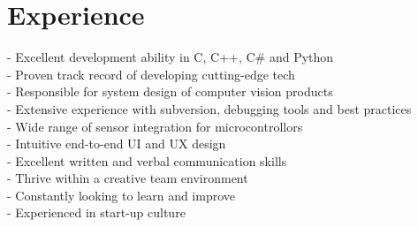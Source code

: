 \documentclass[print]{friggeri-cv} %
\begin{document}
\section{Experience}
- Excellent development ability in C, C++, C\# and Python\\
- Proven track record of developing cutting-edge tech\\
- Responsible for system design of computer vision products\\
- Extensive experience with subversion, debugging tools and best practices\\
- Wide range of sensor integration for microcontrollors\\
- Intuitive end-to-end UI and UX design\\
- Excellent written and verbal communication skills\\
- Thrive within a creative team environment\\
- Constantly looking to learn and improve\\
- Experienced in start-up culture\\

\end{document}
